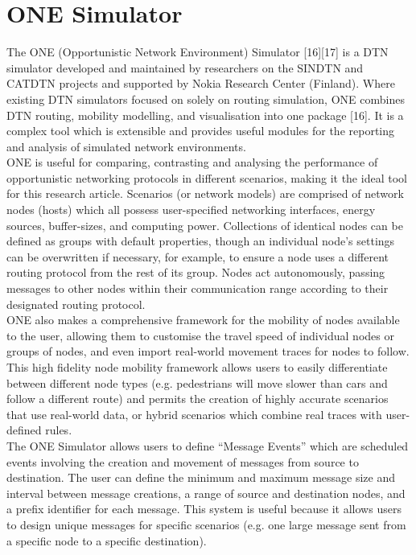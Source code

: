 \documentclass{article}
\begin{document}
\section{ONE Simulator}
The ONE (Opportunistic Network Environment) Simulator [16][17] is a DTN simulator developed and maintained by researchers on the SINDTN and CATDTN projects and supported by Nokia Research Center (Finland). Where existing DTN simulators focused on solely on routing simulation, ONE combines DTN routing, mobility modelling, and visualisation into one package [16]. It is a complex tool which is extensible and provides useful modules for the reporting and analysis of simulated network environments.\\
\newline ONE is useful for comparing, contrasting and analysing the performance of opportunistic networking protocols in different scenarios, making it the ideal tool for this research article. Scenarios (or network models) are comprised of network nodes (hosts) which all possess user-specified networking interfaces, energy sources, buffer-sizes, and computing power. Collections of identical nodes can be defined as groups with default properties, though an individual node's settings can be overwritten if necessary, for example, to ensure a node uses a different routing protocol from the rest of its group. Nodes act autonomously, passing messages to other nodes within their communication range according to their designated routing protocol.\\ 
\newline ONE also makes a comprehensive framework for the mobility of nodes available to the user, allowing them to customise the travel speed of individual nodes or groups of nodes, and even import real-world movement traces for nodes to follow. This high fidelity node mobility framework allows users to easily differentiate between different node types (e.g. pedestrians will move slower than cars and follow a different route) and permits the creation of highly accurate scenarios that use real-world data, or hybrid scenarios which combine real traces with user-defined rules.\\
\newline The ONE Simulator allows users to define ``Message Events'' which are scheduled events involving the creation and movement of messages from source to destination. The user can define the minimum and maximum message size and interval between message creations, a range of source and destination nodes, and a prefix identifier for each message. This system is useful because it allows users to design unique messages for specific scenarios (e.g. one large message sent from a specific node to a specific destination).\\
\end{document}
